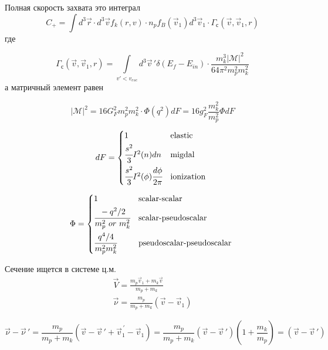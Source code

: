 Полная скорость захвата это интеграл
\begin{equation*}
	\label{eq:capture_rate}
	C_{+} = {\int{d^{3}\vec{r} \cdot d^{3}\vec{v}f_{k}\left( {r,v} \right) \cdot n_{p}f_{B}\left( {\vec{v}}_{1} \right)d^{3}{\vec{v}}_{1} \cdot \Gamma_{с}\left( \vec{v},{\vec{v}}_{1},r \right)}}
\end{equation*}
где

\begin{equation*}
	\label{eq:Gamma_def}
	\Gamma_{с}\left( {\vec{v},{\vec{v}}_{1},r} \right) = {\int\limits_{v' < v_{esc}}{d^{3}{\vec{v}}\,'\delta\left( {E_{f} - E_{in}} \right) \cdot \frac{m_{k}^{3}\left| \mathcal{M} \right|^{2}}{64\pi^{2}m_{p}^{2}m_{k}^{2}}}}
\end{equation*}
а матричный элемент равен

\begin{equation*}
	\left| \mathcal{M} \right|^{2} = 16G_{F}^{2}m_{p}^{2}m_{k}^{2} \cdot \Phi\left( q^{2} \right)dF = 16g_{F}^{2}\frac{m_{k}^{2}}{m_{p}^{2}}\Phi dF
\end{equation*}

\begin{equation*}
	dF = \begin{cases*}
		1 &elastic \\
		\cfrac{s^{2}}{3}I^{2}(n)dn & migdal\\
		\cfrac{s^{2}}{3}I^{2}(\phi)\cfrac{d\phi}{2\pi} & ionization
	\end{cases*}
\end{equation*}

\begin{equation*}
	\Phi = \begin{cases*}
		1 & scalar-scalar\\
		\cfrac{- {q^{2}/2}}{m_{p}^{2}~or~m_{k}^{2}} & scalar-pseudoscalar\\
		\cfrac{q^{4}/4}{m_{p}^{2}m_{k}^{2}} & pseudoscalar-pseudoscalar
	\end{cases*}
\end{equation*}

Сечение ищется в системе ц.м. 
\begin{align*}
	\vec{V} = \frac{m_{p}{\vec{v}}_{1} + m_{k}\vec{v}}{m_{p} + m_{k}}\\
	\vec{\nu} = \frac{m_{p}}{m_{p} + m_{k}}\left( {\vec{v} - {\vec{v}}_{1}} \right)
\end{align*}

\begin{equation*}
	\vec{\nu} - {\vec{\nu}}\,' = \frac{m_{p}}{m_{p} + m_{k}}\left( {\vec{v} - {\vec{v}}\,' + \vec{v}_1^{\,\prime}- {\vec{v}}_{1}} \right) = \frac{m_{p}}{m_{p} + m_{k}}\left( {\vec{v} - {\vec{v}}\,'} \right)\left( {1 + \frac{m_{k}}{m_{p}}} \right) = \left( {\vec{v} - {\vec{v}}\,'} \right)
\end{equation*}

